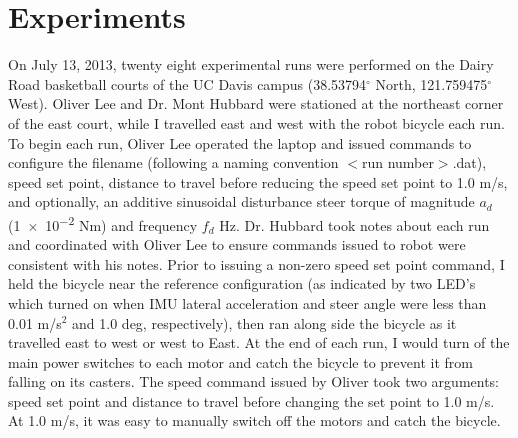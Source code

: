 \section{Experiments} \label{rb:sec:experiments}

On July 13, 2013, twenty eight experimental runs were performed on the Dairy
Road basketball courts of the UC Davis campus (38.53794$^{\circ}$ North,
121.759475$^{\circ}$ West). Oliver Lee and Dr. Mont Hubbard were stationed at the
northeast corner of the east court, while I travelled east and west with the
robot bicycle each run. To begin each run, Oliver Lee operated the laptop and
issued commands to configure the filename (following a naming convention $<$run
number$>$.dat), speed set point, distance to travel before reducing the speed
set point to 1.0 m/s, and optionally, an additive sinusoidal disturbance steer
torque of magnitude $a_d$ (\num{1e-2} Nm) and frequency $f_d$ Hz. Dr. Hubbard took notes
about each run and coordinated with Oliver Lee to ensure commands issued to robot
were consistent with his notes. Prior to issuing a non-zero speed set point
command, I held the bicycle near the reference configuration (as indicated by
two LED's which turned on when IMU lateral acceleration and steer angle were
less than 0.01 m/s$^2$ and 1.0 deg, respectively), then ran along side the
bicycle as it travelled east to west or west to East. At the end of each run, I
would turn of the main power switches to each motor and catch the bicycle to
prevent it from falling on its casters.  The speed command issued by Oliver
took two arguments: speed set point and distance to travel before changing the
set point to 1.0 m/s. At 1.0 m/s, it was easy to manually switch off the motors
and catch the bicycle.
